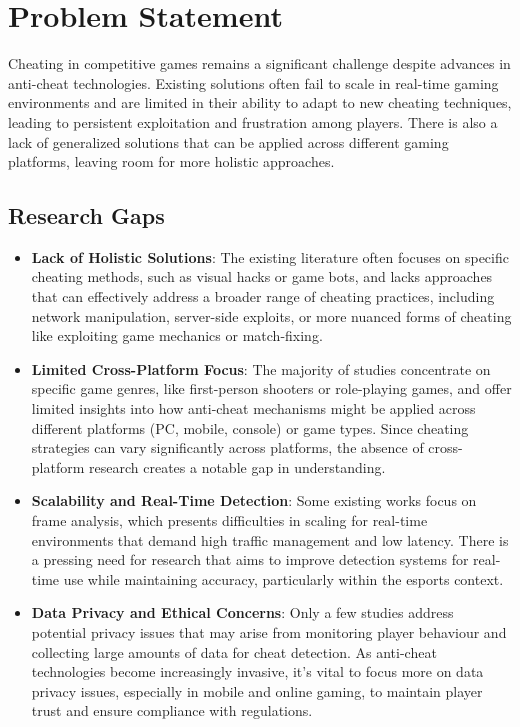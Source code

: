\documentclass[a4paper, 12pt]{article}
\begin{document}
\section{Problem Statement}
Cheating in competitive games remains a significant challenge despite advances in anti-cheat technologies. Existing solutions often fail to scale in real-time gaming environments and are limited in their ability to adapt to new cheating techniques, leading to persistent exploitation and frustration among players. There is also a lack of generalized solutions that can be applied across different gaming platforms, leaving room for more holistic approaches.

\subsection{Research Gaps}
\begin{itemize}
    \item \textbf{Lack of Holistic Solutions}: The existing literature often focuses on specific cheating methods, such as visual hacks or game bots, and lacks approaches that can effectively address a broader range of cheating practices, including network manipulation, server-side exploits, or more nuanced forms of cheating like exploiting game mechanics or match-fixing.
    \item \textbf{Limited Cross-Platform Focus}: The majority of studies concentrate on specific game genres, like first-person shooters or role-playing games, and offer limited insights into how anti-cheat mechanisms might be applied across different platforms (PC, mobile, console) or game types. Since cheating strategies can vary significantly across platforms, the absence of cross-platform research creates a notable gap in understanding.
    \item \textbf{Scalability and Real-Time Detection}: Some existing works focus on frame analysis, which presents difficulties in scaling for real-time environments that demand high traffic management and low latency. There is a pressing need for research that aims to improve detection systems for real-time use while maintaining accuracy, particularly within the esports context.
    \item \textbf{Data Privacy and Ethical Concerns}: Only a few studies address potential privacy issues that may arise from monitoring player behaviour and collecting large amounts of data for cheat detection. As anti-cheat technologies become increasingly invasive, it’s vital to focus more on data privacy issues, especially in mobile and online gaming, to maintain player trust and ensure compliance with regulations.
\end{itemize}
\end{document}
